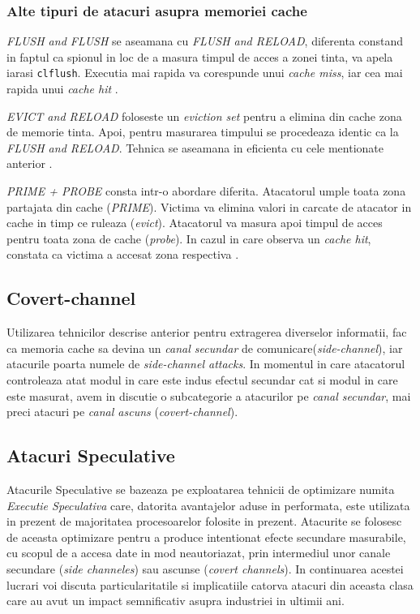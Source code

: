 \subsubsection{Alte tipuri de atacuri asupra memoriei cache}

\emph{FLUSH and FLUSH} se aseamana cu \emph{FLUSH and RELOAD}, diferenta 
constand in faptul ca spionul in loc de a masura timpul de acces a zonei
tinta, va apela iarasi \texttt{clflush}. Executia mai rapida va corespunde
unui \emph{cache miss}, iar cea mai rapida unui \emph{cache hit} \cite{cache_attacks}.

\emph{EVICT and RELOAD} foloseste un \emph{eviction set} pentru a elimina din
cache zona de memorie tinta. Apoi, pentru masurarea timpului se procedeaza 
identic ca la \emph{FLUSH and RELOAD}. Tehnica se aseamana in eficienta cu 
cele mentionate anterior \cite{cache_attacks}.

\emph{PRIME + PROBE} consta intr-o abordare diferita. Atacatorul umple toata
zona partajata din cache (\emph{PRIME}). Victima va elimina valori in carcate
de atacator in cache in timp ce ruleaza (\emph{evict}). Atacatorul va masura 
apoi timpul de acces pentru toata zona de cache (\emph{probe}). In cazul in care observa
un \emph{cache hit}, constata ca victima a accesat zona respectiva \cite{cache_attacks}.

\subsection{Covert-channel}

Utilizarea tehnicilor descrise anterior pentru extragerea diverselor
informatii, fac ca memoria cache sa devina un \emph{canal secundar} de
comunicare(\emph{side-channel}), iar atacurile poarta numele de
\emph{side-channel attacks}. In momentul in care atacatorul controleaza atat
modul in care este indus efectul secundar cat si modul in care este masurat,
avem in discutie o subcategorie a atacurilor pe \emph{canal secundar}, mai
preci atacuri pe \emph{canal ascuns} (\emph{covert-channel}).
 

\subsection{Atacuri Speculative}

Atacurile Speculative se bazeaza pe exploatarea tehnicii de optimizare numita
\emph{Executie Speculativa} care, datorita avantajelor aduse in performata,
este utilizata in prezent de majoritatea procesoarelor folosite in prezent.
Atacurite se folosesc de aceasta optimizare pentru a produce intentionat efecte
secundare masurabile, cu scopul de a accesa date in mod neautoriazat, prin
intermediul unor canale secundare (\emph{side channeles}) sau ascunse
(\emph{covert channels}). In continuarea acestei lucrari voi discuta
particularitatile si implicatiile catorva atacuri din aceasta clasa care au
avut un impact semnificativ asupra industriei in ultimii ani.

